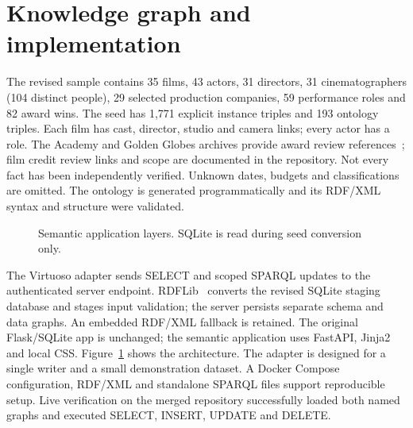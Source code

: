 \documentclass[sigconf,nonacm]{acmart}
\begin{document}
\section{Knowledge graph and implementation}
The revised sample contains 35 films, 43 actors, 31 directors, 31 cinematographers (104 distinct people), 29 selected production companies, 59 performance roles and 82 award wins. The seed has 1,771 explicit instance triples and 193 ontology triples. Each film has cast, director, studio and camera links; every actor has a role. The Academy and Golden Globes archives provide award review references~\cite{oscars,globes}; film credit review links and scope are documented in the repository. Not every fact has been independently verified. Unknown dates, budgets and classifications are omitted. The ontology is generated programmatically and its RDF/XML syntax and structure were validated.
\begin{figure}[h]
\centering
{}
\caption{Semantic application layers. SQLite is read during seed conversion only.}\label{fig:arch}
\end{figure}
The Virtuoso adapter sends SELECT and scoped SPARQL updates to the authenticated server endpoint. RDFLib~\cite{rdflib} converts the revised SQLite staging database and stages input validation; the server persists separate schema and data graphs. An embedded RDF/XML fallback is retained. The original Flask/SQLite app is unchanged; the semantic application uses FastAPI, Jinja2 and local CSS. Figure~\ref{fig:arch} shows the architecture. The adapter is designed for a single writer and a small demonstration dataset. A Docker Compose configuration, RDF/XML and standalone SPARQL files support reproducible setup. Live verification on the merged repository successfully loaded both named graphs and executed SELECT, INSERT, UPDATE and DELETE.
\end{document}

